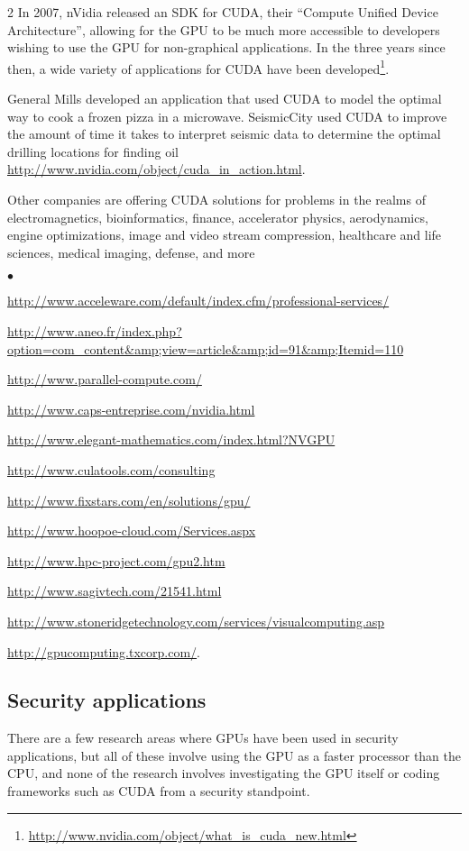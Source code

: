 \documentclass[letterpaper,10pt]{article}
\newcommand{\squishlist}{\begin{list}{$\bullet$}
  {\setlength{\itemsep}{0pt}
    \setlength{\parsep}{3pt}
    \setlength{\topsep}{3pt}
    \setlength{\partopsep}{0pt}
    \setlength{\leftmargin}{1.5em}
    \setlength{\labelwidth}{1em}
    \setlength{\labelsep}{0.5em}
  } }
\newcommand{\squishend}{\end{list}}
\begin{document}
\begin{multicols}{2}
  In 2007, nVidia released an SDK for CUDA, their ``Compute Unified Device
Architecture'', allowing for the GPU to be much more accessible to developers
wishing to use the GPU for non-graphical applications. In the three years since
then, a wide variety of applications for CUDA have been developed\footnote{\url{http://www.nvidia.com/object/what\_is\_cuda\_new.html}}.
  
  General Mills developed an application that used CUDA to model the optimal
way to cook a frozen pizza in a microwave. SeismicCity used CUDA to improve the
amount of time it takes to interpret seismic data to determine the optimal
drilling locations for finding oil
\url{http://www.nvidia.com/object/cuda\_in\_action.html}.
  
  Other companies are offering CUDA solutions for problems in the realms of
electromagnetics, bioinformatics, finance, accelerator physics, aerodynamics,
engine optimizations, image and video stream compression, healthcare and life
sciences, medical imaging, defense, and more
\squishlist
\item \url{http://www.acceleware.com/default/index.cfm/professional-services/}
\item \url{http://www.aneo.fr/index.php?option=com\_content&amp;view=article&amp;id=91&amp;Itemid=110}
\item \url{http://www.parallel-compute.com/}
\item \url{http://www.caps-entreprise.com/nvidia.html}
\item \url{http://www.elegant-mathematics.com/index.html?NVGPU}
\item \url{http://www.culatools.com/consulting}
\item \url{http://www.fixstars.com/en/solutions/gpu/}
\item \url{http://www.hoopoe-cloud.com/Services.aspx}
\item \url{http://www.hpc-project.com/gpu2.htm}
\item \url{http://www.sagivtech.com/21541.html}
\item \url{http://www.stoneridgetechnology.com/services/visualcomputing.asp}
\item \url{http://gpucomputing.txcorp.com/}.
\squishend
  
\subsection{Security applications}
  There are a few research areas where GPUs have been used in security applications, but all of these involve using the GPU as a faster processor than the CPU, and none of the research involves investigating the GPU itself or coding frameworks such as CUDA from a security standpoint.
  

\end{multicols}
\end{document}
